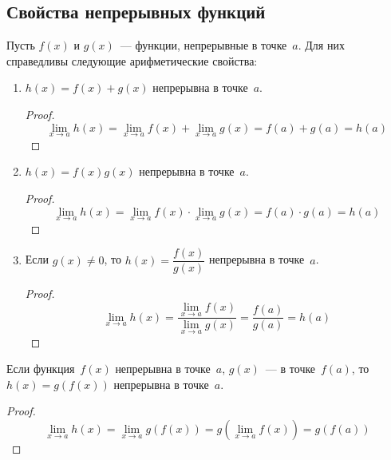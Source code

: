 \subsection{Свойства непрерывных функций}
Пусть $f(x)$ и $g(x)$~--- функции, непрерывные в точке~$a$.
Для них справедливы следующие арифметические свойства:
\begin{enumerate}
	\item $h(x) = f(x) + g(x)$ непрерывна в точке~$a$.
	\begin{proof}
	\begin{equation*}
	\lim_{x \to a} h(x) =
	\lim_{x \to a} f(x) + \lim_{x \to a} g(x) =
	f(a) + g(a) =
	h(a)
	\end{equation*}
	\end{proof}
	
	\item $h(x) = f(x)g(x)$ непрерывна в точке~$a$.
	\begin{proof}
	\begin{equation*}
	\lim_{x \to a} h(x) =
	\lim_{x \to a} f(x) \cdot \lim_{x \to a} g(x) =
	f(a) \cdot g(a) =
	h(a)
	\end{equation*}
	\end{proof}
	
	\item Если $g(x) \neq 0$, то $h(x) = \dfrac{f(x)}{g(x)}$ непрерывна в точке~$a$.
	\begin{proof}
	\begin{equation*}
	\lim_{x \to a} h(x) =
	\frac{\displaystyle \lim_{x \to a} f(x)}{\displaystyle \lim_{x \to a} g(x)} =
	\frac{f(a)}{g(a)} =
	h(a)
	\end{equation*}
	\end{proof}
\end{enumerate}

\begin{statement}
Если функция~$f(x)$ непрерывна в точке~$a$, $g(x)$~--- в точке~$f(a)$, то $h(x) = g(f(x))$ непрерывна в точке~$a$.
\end{statement}
\begin{proof}
\begin{equation*}
\lim_{x \to a} h(x) = \lim_{x \to a} g(f(x)) = g(\lim_{x \to a} f(x)) = g(f(a))
\end{equation*}
\end{proof}

